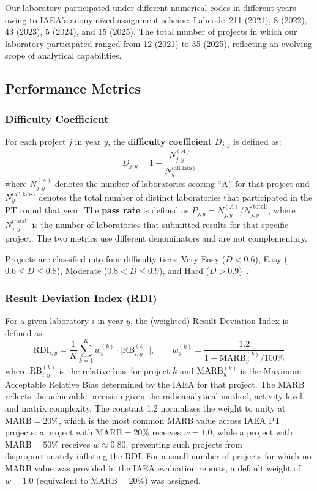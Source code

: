 \documentclass[12pt,a4paper,twoside]{article}
\begin{document}
Our laboratory participated under different numerical codes in different years owing to IAEA's anonymized assignment scheme: Labcode~211 (2021), 8 (2022), 43 (2023), 5 (2024), and 15 (2025). The total number of projects in which our laboratory participated ranged from 12 (2021) to 35 (2025), reflecting an evolving scope of analytical capabilities.

\subsection{Performance Metrics}

\subsubsection{Difficulty Coefficient}

For each project $j$ in year $y$, the \textbf{difficulty coefficient} $D_{j,y}$ is defined as:
\begin{equation}
  D_{j,y} = 1 - \frac{N_{j,y}^{(A)}}{N_{y}^{\text{(all labs)}}}
  \label{eq:difficulty}
\end{equation}
where $N_{j,y}^{(A)}$ denotes the number of laboratories scoring ``A'' for that project and $N_{y}^{\text{(all labs)}}$ denotes the total number of distinct laboratories that participated in the PT round that year. The \textbf{pass rate} is defined as $P_{j,y} = N_{j,y}^{(A)} / N_{j,y}^{\text{(total)}}$, where $N_{j,y}^{\text{(total)}}$ is the number of laboratories that submitted results for that specific project. The two metrics use different denominators and are not complementary.

Projects are classified into four difficulty tiers: Very Easy ($D < 0.6$), Easy ($0.6 \leq D \leq 0.8$), Moderate ($0.8 < D \leq 0.9$), and Hard ($D > 0.9$)~\cite{iaea2017}.

\subsubsection{Result Deviation Index (RDI)}

For a given laboratory $i$ in year $y$, the (weighted) Result Deviation Index is defined as:
\begin{equation}
  \text{RDI}_{i,y} = \frac{1}{K} \sum_{k=1}^{K} w^{(k)}_y \cdot \bigl| \text{RB}_{i,y}^{(k)} \bigr|,
  \qquad w^{(k)}_y = \frac{1.2}{1 + \text{MARB}^{(k)}_y / 100\%}
  \label{eq:rdi}
\end{equation}
where $\text{RB}_{i,y}^{(k)}$ is the relative bias for project $k$ and $\text{MARB}^{(k)}_y$ is the Maximum Acceptable Relative Bias determined by the IAEA for that project. The MARB reflects the achievable precision given the radioanalytical method, activity level, and matrix complexity. The constant 1.2 normalizes the weight to unity at $\text{MARB} = 20\%$, which is the most common MARB value across IAEA PT projects: a project with $\text{MARB} = 20\%$ receives $w = 1.0$, while a project with $\text{MARB} = 50\%$ receives $w \approx 0.80$, preventing such projects from disproportionately inflating the RDI. For a small number of projects for which no MARB value was provided in the IAEA evaluation reports, a default weight of $w = 1.0$ (equivalent to $\text{MARB} = 20\%$) was assigned.
\end{document}
